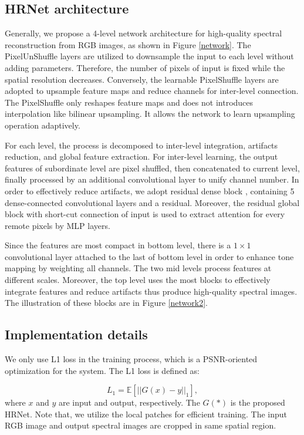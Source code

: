 \documentclass[10pt,twocolumn,letterpaper]{article}
\begin{document}
\subsection{HRNet architecture}

Generally, we propose a 4-level network architecture for high-quality spectral reconstruction from RGB images, as shown in Figure \ref{network}. The PixelUnShuffle layers \cite{shi2016real} are utilized to downsample the input to each level without adding parameters. Therefore, the number of pixels of input is fixed while the spatial resolution decreases. Conversely, the learnable PixelShuffle layers are adopted to upsample feature maps and reduce channels for inter-level connection. The PixelShuffle only reshapes feature maps and does not introduces interpolation like bilinear upsampling. It allows the network to learn upsampling operation adaptively.

For each level, the process is decomposed to inter-level integration, artifacts reduction, and global feature extraction. For inter-level learning, the output features of subordinate level are pixel shuffled, then concatenated to current level, finally processed by an additional convolutional layer to unify channel number. In order to effectively reduce artifacts, we adopt residual dense block \cite{he2016deep, huang2017densely}, containing 5 dense-connected convolutional layers and a residual. Moreover, the residual global block \cite{he2016deep, hu2018squeeze} with short-cut connection of input is used to extract attention for every remote pixels by MLP layers.

Since the features are most compact in bottom level, there is a $1 \times 1$ convolutional layer attached to the last of bottom level in order to enhance tone mapping by weighting all channels. The two mid levels process features at different scales. Moreover, the top level uses the most blocks to effectively integrate features and reduce artifacts thus produce high-quality spectral images. The illustration of these blocks are in Figure \ref{network2}.

\subsection{Implementation details}

We only use L1 loss in the training process, which is a PSNR-oriented optimization for the system. The L1 loss is defined as:

\begin{equation}
L_{1} = \mathbb{E}[||G(x) - y||_1],
\end{equation}
where $x$ and $y$ are input and output, respectively. The $G(*)$ is the proposed HRNet. Note that, we utilize the local patches for efficient training. The input RGB image and output spectral images are cropped in same spatial region.
\end{document}
